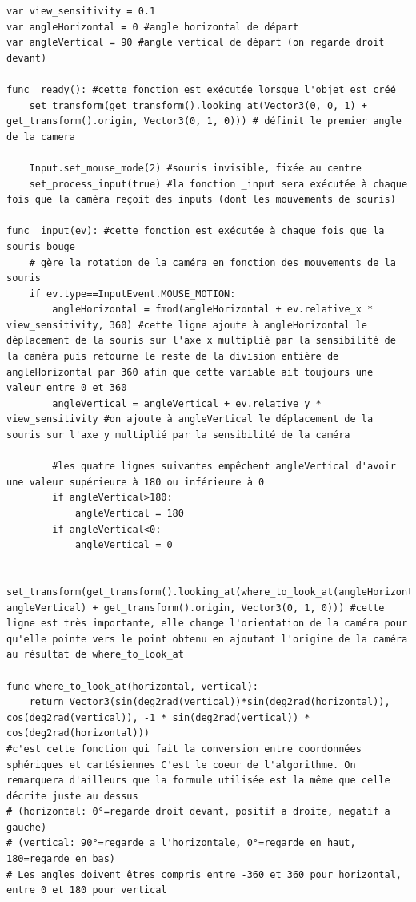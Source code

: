\renewcommand{\codeTitle}{Code de la caméra}
\begin{lstlisting}[caption=cameraControls.gd]
var view_sensitivity = 0.1
var angleHorizontal = 0 #angle horizontal de départ
var angleVertical = 90 #angle vertical de départ (on regarde droit devant)

func _ready(): #cette fonction est exécutée lorsque l'objet est créé
	set_transform(get_transform().looking_at(Vector3(0, 0, 1) + get_transform().origin, Vector3(0, 1, 0))) # définit le premier angle de la camera	
	
	Input.set_mouse_mode(2) #souris invisible, fixée au centre
	set_process_input(true) #la fonction _input sera exécutée à chaque fois que la caméra reçoit des inputs (dont les mouvements de souris)

func _input(ev): #cette fonction est exécutée à chaque fois que la souris bouge
	# gère la rotation de la caméra en fonction des mouvements de la souris
	if ev.type==InputEvent.MOUSE_MOTION:
		angleHorizontal = fmod(angleHorizontal + ev.relative_x * view_sensitivity, 360) #cette ligne ajoute à angleHorizontal le déplacement de la souris sur l'axe x multiplié par la sensibilité de la caméra puis retourne le reste de la division entière de angleHorizontal par 360 afin que cette variable ait toujours une valeur entre 0 et 360
		angleVertical = angleVertical + ev.relative_y * view_sensitivity #on ajoute à angleVertical le déplacement de la souris sur l'axe y multiplié par la sensibilité de la caméra
		
		#les quatre lignes suivantes empêchent angleVertical d'avoir une valeur supérieure à 180 ou inférieure à 0
		if angleVertical>180:
			angleVertical = 180
		if angleVertical<0:
			angleVertical = 0
		
		set_transform(get_transform().looking_at(where_to_look_at(angleHorizontal, angleVertical) + get_transform().origin, Vector3(0, 1, 0))) #cette ligne est très importante, elle change l'orientation de la caméra pour qu'elle pointe vers le point obtenu en ajoutant l'origine de la caméra au résultat de where_to_look_at

func where_to_look_at(horizontal, vertical):
	return Vector3(sin(deg2rad(vertical))*sin(deg2rad(horizontal)), cos(deg2rad(vertical)), -1 * sin(deg2rad(vertical)) * cos(deg2rad(horizontal)))
#c'est cette fonction qui fait la conversion entre coordonnées sphériques et cartésiennes C'est le coeur de l'algorithme. On remarquera d'ailleurs que la formule utilisée est la même que celle décrite juste au dessus
# (horizontal: 0°=regarde droit devant, positif a droite, negatif a gauche)
# (vertical: 90°=regarde a l'horizontale, 0°=regarde en haut, 180=regarde en bas)
# Les angles doivent êtres compris entre -360 et 360 pour horizontal, entre 0 et 180 pour vertical
\end{lstlisting}


